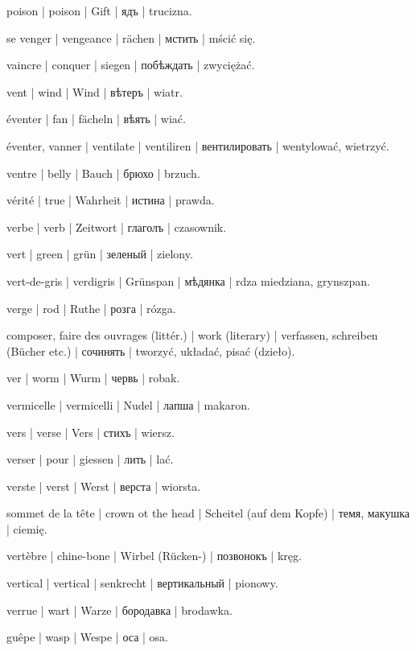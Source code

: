 \begin{outdent}{1em}
poison | poison | Gift | ядъ | trucizna.

se venger | vengeance | rächen | мстить | mścić się.

vaincre | conquer | siegen | побѣждать | zwyciężać.

vent | wind | Wind | вѣтеръ | wiatr.

\uvsubentry{}
éventer | fan | fächeln | вѣять | wiać.

éventer, vanner | ventilate | ventiliren | вентилировать | wentylować, wietrzyć.

ventre | belly | Bauch | брюхо | brzuch.

vérité | true | Wahrheit | истина | prawda.

verbe | verb | Zeitwort | глаголъ | czasownik.

vert | green | grün | зеленый | zielony.

vert-de-gris | verdigris | Grünspan | мѣдянка | rdza
miedziana, grynszpan.

verge | rod | Ruthe | розга | rózga.

composer, faire des ouvrages (littér.) | work (literary) | verfassen, schreiben (Bücher etc.) | сочинять | tworzyć, układać,
pisać (dzieło).

ver | worm | Wurm | червь | robak.

vermicelle | vermicelli | Nudel | лапша | makaron.

vers | verse | Vers | стихъ | wiersz.

verser | pour | giessen | лить | lać.

verste | verst | Werst | верста | wiorsta.

sommet de la tête | crown ot the head | Scheitel (auf dem
Kopfe) | темя, макушка | ciemię.

vertèbre | chine-bone | Wirbel (Rücken-) | позвонокъ | kręg.

vertical | vertical | senkrecht | вертикальный | pionowy.

verrue | wart | Warze | бородавка | brodawka.

guêpe | wasp | Wespe | оса | osa.


\end{outdent}
